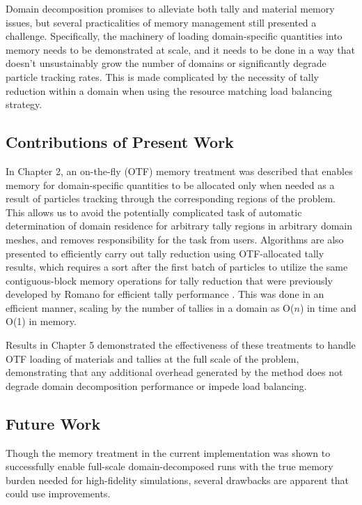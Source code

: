 Domain decomposition promises to alleviate both tally and material memory
issues, but several practicalities of memory management still presented a
challenge. Specifically, the machinery of loading domain-specific quantities
into memory needs to be demonstrated at scale, and it needs to be done in a way
that doesn't unsustainably grow the number of domains or significantly degrade
particle tracking rates. This is made complicated by the necessity of tally
reduction within a domain when using the resource matching load balancing
strategy.

\subsection{Contributions of Present Work}

In Chapter 2, an on-the-fly (OTF) memory treatment was described that enables
memory for domain-specific quantities to be allocated only when needed as a
result of particles tracking through the corresponding regions of the problem.
This allows us to avoid the potentially complicated task of automatic
determination of domain residence for arbitrary tally regions in arbitrary
domain meshes, and removes responsibility for the task from users. Algorithms
are also presented to efficiently carry out tally reduction using OTF-allocated
tally results, which requires a sort after the first batch of particles to
utilize the same contiguous-block memory operations for tally reduction that
were previously developed by Romano for efficient tally performance
\cite{romano_thesis}. This was done in an efficient manner, scaling by the
number of tallies in a domain as O($n$) in time and O(1) in memory.

Results in Chapter 5 demonstrated the effectiveness of these treatments to
handle OTF loading of materials and tallies at the full scale of the problem,
demonstrating that any additional overhead generated by the method does not
degrade domain decomposition performance or impede load balancing.

\subsection{Future Work}

Though the memory treatment in the current implementation was shown to
successfully enable full-scale domain-decomposed runs with the true memory
burden needed for high-fidelity simulations, several drawbacks are apparent that
could use improvements.

